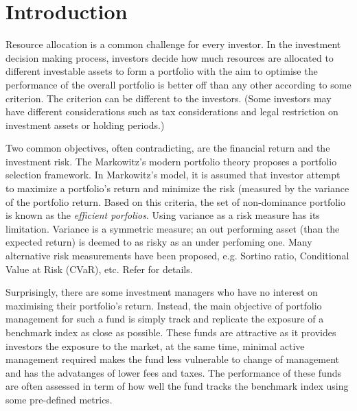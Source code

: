 \chapter{Introduction}
\graphicspath{{Chapter1/figures/}}
\label{Introduction}
Resource allocation is a common challenge for every investor. In the investment decision making process, investors decide how much resources are allocated to different investable assets to form a portfolio with the aim to optimise the performance of the overall portfolio is better off than any other according to some criterion. The criterion can be different to the investors. (Some investors may have different considerations such as tax considerations and legal restriction on investment assets or holding periods.)

Two common objectives, often contradicting, are the financial return and the investment risk. The Markowitz's modern portfolio theory \cite{HM52} proposes a portfolio selection framework. In Markowitz's model, it is assumed that investor attempt to maximize a portfolio's return and minimize the risk (measured by the variance of the portfolio return. Based on this criteria, the set of non-dominance portfolio is known as the \emph{efficient porfolios}. Using variance as a risk measure has its limitation. Variance is a symmetric measure; an out performing asset (than the expected return) is deemed to as risky as an under perfoming one. Many alternative risk measurements have been proposed, e.g. Sortino ratio, Conditional Value at Risk (CVaR), etc. Refer \cite{RTR00} for details.


Surprisingly, there are some investment managers who have no interest on maximising their portfolio's return. Instead, the main objective of portfolio management for such a fund is simply track and replicate the exposure of a benchmark index as close as possible. These funds are attractive as it provides investors the exposure to the market, at the same time, minimal active management required makes the fund less vulnerable to change of management and has the advatanges of lower fees and taxes. The performance of these funds are often assessed in term of how well the fund tracks the benchmark index using some pre-defined metrics.

